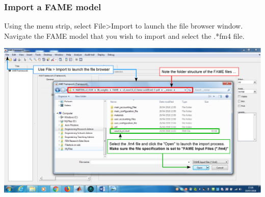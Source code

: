 \newpage
\begin{landscape}
\subsubsection{Import a FAME model}
Using the menu strip, select File>Import to launch the file browser window. Navigate the FAME model that you wish to import and select the .*fm4 file.

\includegraphics[width=1.3\textwidth]{ImportFame.eps}
\end{landscape}
